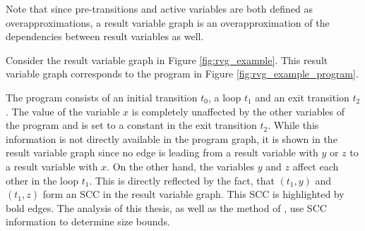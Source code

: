 Note that since pre-transitions and active variables are both defined as overapproximations, a result variable graph is an overapproximation of the dependencies between result variables as well.

\begin{example}
  Consider the result variable graph in Figure \ref{fig:rvg_example}.
  This result variable graph corresponds to the program in Figure \ref{fig:rvg_example_program}.
  
  The program consists of an initial transition $t_0$, a loop $t_1$ and an exit transition $t_2$.
  The value of the variable $x$ is completely unaffected by the other variables of the program and is set to a constant in the exit transition $t_2$.
  While this information is not directly available in the program graph, it is shown in the result variable graph since no edge is leading from a result variable with $y$ or $z$ to a result variable with $x$.
  On the other hand, the variables $y$ and $z$ affect each other in the loop $t_1$.
  This is directly reflected by the fact, that $(t_1,y)$ and $(t_1,z)$ form an SCC in the result variable graph.
  This SCC is highlighted by bold edges.
  The analysis of this thesis, as well as the method of \cite{koat}, use SCC information to determine size bounds.
\end{example}
